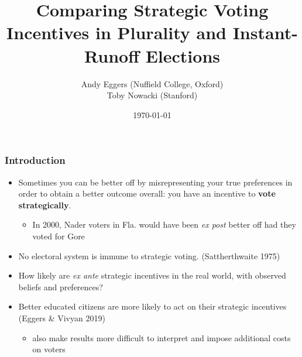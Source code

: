\documentclass[10pt, en-GB]{beamer}
\title{Comparing Strategic Voting Incentives in Plurality and Instant-Runoff Elections}
\subtitle{}
\date{\today}
\author{Andy Eggers (Nuffield College, Oxford) \\ Toby Nowacki (Stanford)}
\begin{document}
\maketitle



\begin{frame}[t]\frametitle{Introduction}
    \begin{itemize}[<+->]
    	\item Sometimes you can be better off by misrepresenting your true preferences in order to obtain a better outcome overall: you have an incentive to \textbf{vote strategically}.
    	\begin{itemize}
    		\item {\color{gray} In 2000, Nader voters in Fla. would have been \emph{ex post} better off had they voted for Gore}
    	\end{itemize}
    	\item No electoral system is immune to strategic voting. (Sattherthwaite 1975)
    	\item How likely are \emph{ex ante} strategic incentives in the real world, with observed beliefs and preferences?
    	\item Better educated citizens are more likely to act on their strategic incentives (Eggers \& Vivyan 2019)
    	\begin{itemize}
    		\item {\color{gray} also make results more difficult to interpret and impose additional costs on voters}
    	\end{itemize}
    \end{itemize}
\end{frame}
\end{document}
